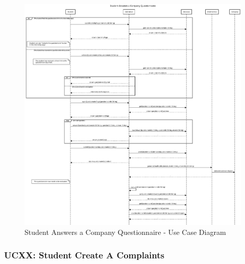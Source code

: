 \begin{figure}[H]
    \centering
    \includegraphics[width=1.0\textwidth]{Images/UC_5.pdf}
    \caption{Student Answers a Company Questionnaire - Use Case Diagram}
    \label{fig:use-case-diagram-5}
\end{figure}


\subsubsection{UCXX: Student Create A Complaints}
\label{subsubsec:student-create-a-complaints}

